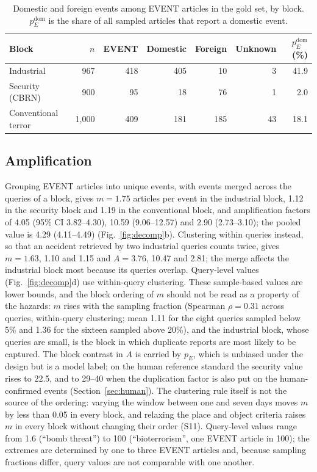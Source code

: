 \documentclass[1p,times]{elsarticle}
\begin{document}
\begin{table}[!htb]
\centering\small
\caption{Domestic and foreign events among EVENT articles in the gold set, by block. $p_E^{\mathrm{dom}}$ is the share of all sampled articles that report a domestic event.}
\label{tab:domestic}
\begin{tabular*}{\textwidth}{@{\extracolsep{\fill}}lrrrrrr@{}}
\toprule
Block & $n$ & EVENT & Domestic & Foreign & Unknown & $p_E^{\mathrm{dom}}$ (\%) \\
\midrule
Industrial & 967 & 418 & 405 & 10 & 3 & 41.9 \\
Security (CBRN) & 900 & 95 & 18 & 76 & 1 & 2.0 \\
Conventional terror & 1,000 & 409 & 181 & 185 & 43 & 18.1 \\
\bottomrule
\end{tabular*}
\end{table}

\subsection{Amplification}
\label{sec:amplification}
\label{sec:amp}
Grouping EVENT articles into unique events, with events merged across the queries of a block, gives $m = 1.75$ articles per event in the industrial block, 1.12 in the security block and 1.19 in the conventional block, and amplification factors of 4.05 (95\% CI 3.82--4.30), 10.59 (9.06--12.57) and 2.90 (2.73--3.10); the pooled value is 4.29 (4.11--4.49) (Fig.~\ref{fig:decomp}b). Clustering within queries instead, so that an accident retrieved by two industrial queries counts twice, gives $m = 1.63$, 1.10 and 1.15 and $A = 3.76$, 10.47 and 2.81; the merge affects the industrial block most because its queries overlap. Query-level values (Fig.~\ref{fig:decomp}d) use within-query clustering. These sample-based values are lower bounds, and the block ordering of $m$ should not be read as a property of the hazards: $m$ rises with the sampling fraction (Spearman $\rho = 0.31$ across queries, within-query clustering; mean 1.11 for the eight queries sampled below 5\% and 1.36 for the sixteen sampled above 20\%), and the industrial block, whose queries are small, is the block in which duplicate reports are most likely to be captured. The block contrast in $A$ is carried by $p_E$, which is unbiased under the design but is a model label; on the human reference standard the security value rises to 22.5, and to 29--40 when the duplication factor is also put on the human-confirmed events (Section~\ref{sec:human}). The clustering rule itself is not the source of the ordering: varying the window between one and seven days moves $m$ by less than 0.05 in every block, and relaxing the place and object criteria raises $m$ in every block without changing their order (S11). Query-level values range from 1.6 (``bomb threat'') to 100 (``bioterrorism'', one EVENT article in 100); the extremes are determined by one to three EVENT articles and, because sampling fractions differ, query values are not comparable with one another.
\end{document}
